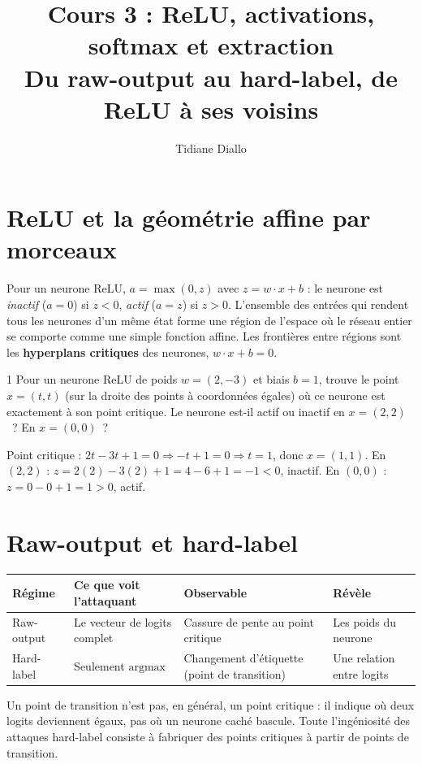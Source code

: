 \documentclass[11pt]{article}
\title{Cours 3 : ReLU, activations, softmax et extraction\\[0.3em]\large Du raw-output au hard-label, de ReLU à ses voisins}
\author{Tidiane Diallo}
\date{}
\begin{document}
\maketitle
\tableofcontents

\section{ReLU et la géométrie affine par morceaux}

Pour un neurone ReLU, $a=\max(0,z)$ avec $z=w\cdot x+b$ : le neurone est \emph{inactif} ($a=0$) si $z<0$, \emph{actif} ($a=z$) si $z>0$. L'ensemble des entrées qui rendent tous les neurones d'un même état forme une région de l'espace où le réseau entier se comporte comme une simple fonction affine. Les frontières entre régions sont les \textbf{hyperplans critiques} des neurones, $w\cdot x+b=0$.

\begin{exo}{1}
Pour un neurone ReLU de poids $w=(2,-3)$ et biais $b=1$, trouve le point $x=(t,t)$ (sur la droite des points à coordonnées égales) où ce neurone est exactement à son point critique. Le neurone est-il actif ou inactif en $x=(2,2)$~? En $x=(0,0)$~?
\end{exo}
\begin{sol}
Point critique : $2t-3t+1=0 \Rightarrow -t+1=0 \Rightarrow t=1$, donc $x=(1,1)$.
En $(2,2)$ : $z=2(2)-3(2)+1=4-6+1=-1<0$, inactif.
En $(0,0)$ : $z=0-0+1=1>0$, actif.
\end{sol}

\section{Raw-output et hard-label}

\begin{table}[h]
\centering
\begin{tabular}{llll}
\toprule
Régime & Ce que voit l'attaquant & Observable & Révèle \\
\midrule
Raw-output & Le vecteur de logits complet & Cassure de pente au point critique & Les poids du neurone \\
Hard-label & Seulement $\mathrm{argmax}$ & Changement d'étiquette (point de transition) & Une relation entre logits \\
\bottomrule
\end{tabular}
\end{table}

\begin{remarque}
Un point de transition n'est pas, en général, un point critique : il indique où deux logits deviennent égaux, pas où un neurone caché bascule. Toute l'ingéniosité des attaques hard-label consiste à fabriquer des points critiques à partir de points de transition.
\end{remarque}
\end{document}
